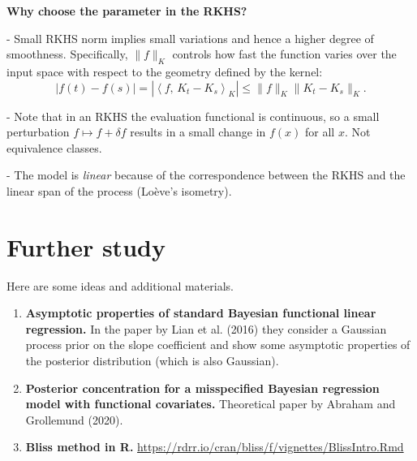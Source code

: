 \documentclass[
  a4paper,
	fontsize=11pt, %
	twoside=false, %
  secnumdepth=2,
	numbers=noenddot, %
]{kaohandt}
\newcommand\dotprod[2]{\left\langle #1,\, #2 \right\rangle}
\begin{document}
  \textbf{Why choose the parameter in the RKHS?}

  - Small RKHS norm implies small variations and hence a higher degree of smoothness. Specifically, \(\|f\|_K\) controls how fast the function varies over the input space with respect to the geometry defined by the kernel:
  \[
  |f(t) - f(s)| = |\dotprod{f}{K_t - K_s}_K| \leq \|f\|_K \|K_t - K_s\|_K.
  \]

  - Note that in an RKHS the evaluation functional is continuous, so a small perturbation \(f\mapsto f + \delta f\) results in a small change in \(f(x)\) for all \(x\). Not equivalence classes.

  - The model is \textit{linear} because of the correspondence between the RKHS and the linear span of the process (Loève's isometry).




\renewcommand*{\bibfont}{\small}
\printbibliography[title=Bibliography]%



\appendix

\section{Further study}

Here are some ideas and additional materials.

\begin{enumerate}

  \item \textbf{Asymptotic properties of standard Bayesian functional linear regression.} In the paper by Lian et al. (2016) they consider a Gaussian process prior on the slope coefficient and show some asymptotic properties of the posterior distribution (which is also Gaussian).

  \item \textbf{Posterior concentration for a misspecified Bayesian regression model with functional covariates.} Theoretical paper by Abraham and Grollemund (2020).

  \item \textbf{Bliss method in R.} \url{https://rdrr.io/cran/bliss/f/vignettes/BlissIntro.Rmd}

\end{enumerate}
\end{document}
